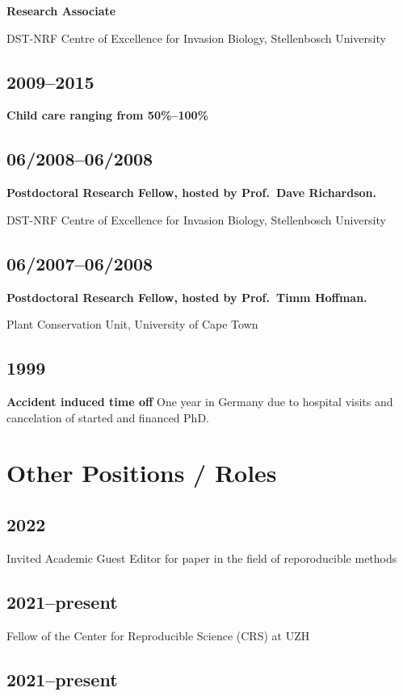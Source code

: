 \documentclass[a4paper]{article}
\begin{document}
\textbf{Research Associate}

DST-NRF Centre of Excellence for Invasion Biology, Stellenbosch University

\subsection{2009--2015 }

\textbf{Child care ranging from 50\%--100\%}


\subsection{06/2008--06/2008}

\textbf{Postdoctoral Research Fellow, hosted by Prof.\ Dave Richardson.}

DST-NRF Centre of Excellence for Invasion Biology, Stellenbosch University

\subsection{06/2007--06/2008}

\textbf{Postdoctoral Research Fellow, hosted by Prof.\ Timm Hoffman.} 

Plant Conservation Unit, University of Cape Town

\subsection{1999}
\textbf{Accident induced time off}
One year in Germany due to hospital visits and cancelation of started and financed PhD.


\section{Other Positions / Roles}

\subsection{2022}
Invited Academic Guest Editor for paper in the field of reporoducible methods


\subsection{2021--present}
Fellow of the Center for Reproducible Science (CRS) at UZH

\subsection{2021--present}
\end{document}
